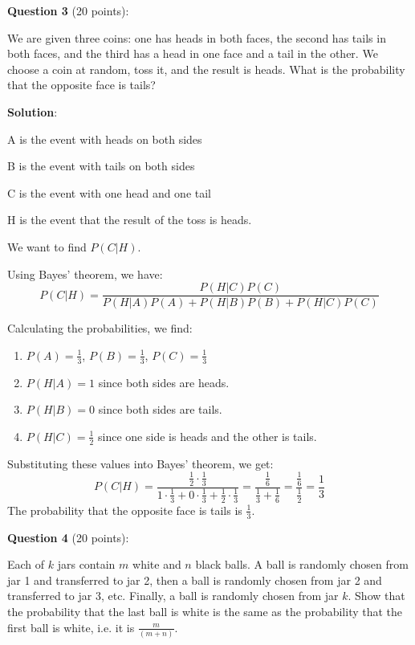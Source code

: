 \documentclass{article}
\begin{document}
\vspace{1cm}
\noindent
\textbf{Question 3} (20 points): 

\noindent
We are given three coins: one has heads in both faces, the second has tails in both faces, and the third has a head in one face and a tail in the other.  We choose a coin at random, toss it, and the result is heads.  What is the probability that the opposite face is tails?

\noindent
\textbf{Solution}:

A is the event with heads on both sides

B is the event with tails on both sides

C is the event with one head and one tail

H is the event that the result of the toss is heads.

We want to find $P(C|H)$. 

Using Bayes' theorem, we have:
\[P(C|H) = \frac{P(H|C)P(C)}{P(H|A)P(A) + P(H|B)P(B) + P(H|C)P(C)}\]

Calculating the probabilities, we find:
\begin{enumerate}
    \item $P(A) = \frac{1}{3}$, $P(B) = \frac{1}{3}$, $P(C) = \frac{1}{3}$
    \item $P(H|A) = 1$ since both sides are heads.
    \item $P(H|B) = 0$ since both sides are tails.
    \item $P(H|C) = \frac{1}{2}$ since one side is heads and the other is tails.
\end{enumerate}

Substituting these values into Bayes' theorem, we get:
\[P(C|H) = \frac{\frac{1}{2} \cdot \frac{1}{3}}{1 \cdot \frac{1}{3} + 0 \cdot \frac{1}{3} + \frac{1}{2} \cdot \frac{1}{3}} = \frac{\frac{1}{6}}{\frac{1}{3} + \frac{1}{6}} = \frac{\frac{1}{6}}{\frac{1}{2}} = \frac{1}{3}\]
The probability that the opposite face is tails is $\frac{1}{3}$.

\vspace{1cm}
\noindent
\textbf{Question 4} (20 points):

\noindent
Each of $k$ jars contain $m$ white and $n$ black balls.  A ball is randomly chosen from jar 1 and transferred to jar 2, then a ball is randomly chosen from jar 2 and transferred to jar 3, etc.  Finally, a ball is randomly chosen from jar $k$.  Show that the probability that the last ball is white is the same as the probability that the first ball is white, i.e. it is $\frac{m}{(m+n)}$.
\end{document}
